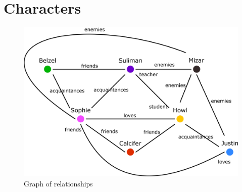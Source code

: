 \chapter{Characters}

  
  
  
  
  
  
  
  
  \begin{figure}
    \includegraphics[scale=0.35]{Images/relationships}
    \caption{Graph of relationships}
  \end{figure}

